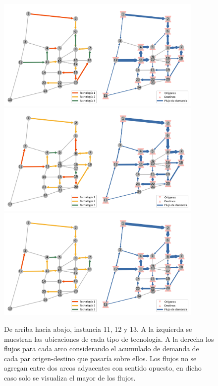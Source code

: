\begin{figure}[h!]
  \centering
  \includegraphics[width=10cm]{../resources/sioux_falls_0.4_budget_factor_linear_5_breakpoints.png}
  \includegraphics[width=10cm]{../resources/sioux_falls_0.4_budget_factor_linear_20_breakpoints.png}
  \includegraphics[width=10cm]{../resources/sioux_falls_0.4_budget_factor_linear_50_breakpoints.png}
  \caption{De arriba hacia abajo, instancia 11, 12 y 13. A la izquierda se muestran las ubicaciones de cada tipo de tecnología. A la derecha los flujos para cada arco considerando el acumulado de demanda de cada par origen-destino que pasaría sobre ellos. Los flujos no se agregan entre dos arcos adyacentes con sentido opuesto, en dicho caso solo se visualiza el mayor de los flujos.}
  \label{fig:sensibilityinstance11_12_13}
\end{figure}

